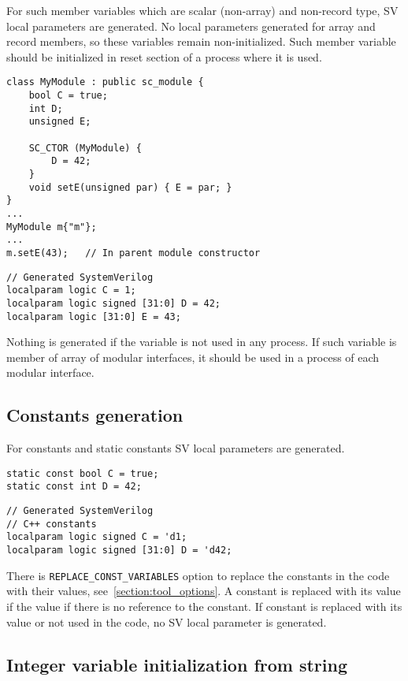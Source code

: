 For such member variables which are scalar (non-array) and non-record type, SV local parameters are generated. 
No local parameters generated for array and record members, so these variables remain non-initialized. Such member variable should be initialized in reset section of a process where it is used.

\begin{lstlisting}[style=mycpp]
class MyModule : public sc_module {
  	bool C = true;
	int D;
   	unsigned E;

	SC_CTOR (MyModule) {
   		D = 42;
	}
	void setE(unsigned par) { E = par; }
}
...
MyModule m{"m"};
...
m.setE(43);   // In parent module constructor
\end{lstlisting}
%
\begin{lstlisting}[style=myverilog]
// Generated SystemVerilog
localparam logic C = 1;
localparam logic signed [31:0] D = 42;
localparam logic [31:0] E = 43;
\end{lstlisting}

Nothing is generated if the variable is not used in any process. If such variable is member of array of modular interfaces, it should be used in a process of each modular interface.

\subsection{Constants generation}\label{section:const_gen}

For constants and static constants SV local parameters are generated.

\begin{lstlisting}[style=mycpp]
static const bool C = true;
static const int D = 42;
\end{lstlisting}
%
\begin{lstlisting}[style=myverilog]
// Generated SystemVerilog
// C++ constants
localparam logic signed C = 'd1;
localparam logic signed [31:0] D = 'd42;
\end{lstlisting}

There is {\tt REPLACE\_CONST\_VARIABLES} option to replace the constants in the code with their values, see~\ref{section:tool_options}. A constant is replaced with its value if the value if there is no reference to the constant. If constant is replaced with its value or not used in the code, no SV local parameter is generated.

\subsection{Integer variable initialization from string}\label{section:string_to_int}

